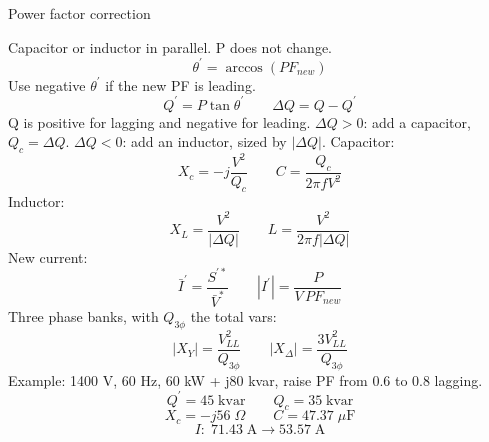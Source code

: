 Power factor correction

Capacitor or inductor in parallel. P does not change.
$$\theta^{\prime}=\arccos(PF_{new})$$
Use negative $\theta^{\prime}$ if the new PF is leading.
$$Q^{\prime}=P\tan\theta^{\prime}\qquad \Delta Q=Q-Q^{\prime}$$
Q is positive for lagging and negative for leading.
$\Delta Q>0$: add a capacitor, $Q_c=\Delta Q$.
$\Delta Q<0$: add an inductor, sized by $\left|\Delta Q\right|$.
Capacitor:
$$X_c=-j\frac{V^2}{Q_c}\qquad C=\frac{Q_c}{2\pi fV^2}$$
Inductor:
$$X_L=\frac{V^2}{\left|\Delta Q\right|}\qquad L=\frac{V^2}{2\pi f\left|\Delta Q\right|}$$
New current:
$$\bar I^{\prime}=\frac{S^{\prime *}}{\bar V^{*}}\qquad \left|I^{\prime}\right|=\frac{P}{V\,PF_{new}}$$
Three phase banks, with $Q_{3\phi}$ the total vars:
$$\left|X_Y\right|=\frac{V_{LL}^2}{Q_{3\phi}}\qquad \left|X_\Delta\right|=\frac{3V_{LL}^2}{Q_{3\phi}}$$
Example: 1400 V, 60 Hz, 60 kW + j80 kvar, raise PF from 0.6 to 0.8 lagging.
$$Q^{\prime}=45\;\text{kvar}\qquad Q_c=35\;\text{kvar}$$
$$X_c=-j56\;\Omega\qquad C=47.37\;\mu\text{F}$$
$$I:\;71.43\;\text{A}\to53.57\;\text{A}$$
